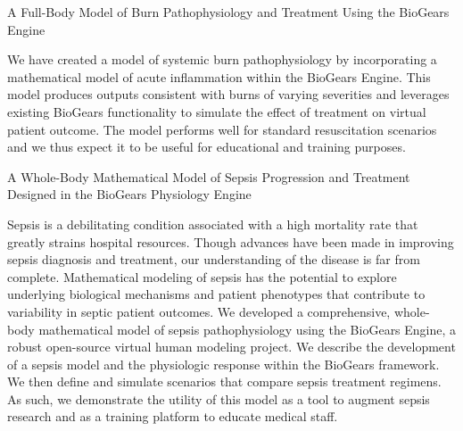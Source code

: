 \begin{refsection}
    \nocite{baird2013electro}

	\newrefcontext[sorting=nyt]
	\printbibliography[heading=none]
\end{refsection}


\begin{refsection}
    \nocite{baird2023Whole}

	\newrefcontext[sorting=nyt]
	\printbibliography[heading=none]
\end{refsection}


  \cventry
    {A Full-Body Model of Burn Pathophysiology and Treatment Using the BioGears Engine} %
    {} %
    {} %
    {} %
     {
    \begin{cvitems} %
    \item {We have created a model of systemic burn pathophysiology by incorporating a mathematical model of acute inflammation within the BioGears Engine. This model produces outputs consistent with burns of varying severities and leverages existing BioGears functionality to simulate the effect of treatment on virtual patient outcome. The model performs well for standard resuscitation scenarios and we thus expect it to be useful for educational and training purposes.}
    \end{cvitems}
     }

  \cventry
    {A Whole-Body Mathematical Model of Sepsis Progression and Treatment Designed in the BioGears Physiology Engine} %
    {} %
    {} %
    {} %
     {
    \begin{cvitems} %
    \item {Sepsis is a debilitating condition associated with a high mortality rate that greatly strains hospital resources. Though advances have been made in improving sepsis diagnosis and treatment, our understanding of the disease is far from complete. Mathematical modeling of sepsis has the potential to explore underlying biological mechanisms and patient phenotypes that contribute to variability in septic patient outcomes. We developed a comprehensive, whole-body mathematical model of sepsis pathophysiology using the BioGears Engine, a robust open-source virtual human modeling project. We describe the development of a sepsis model and the physiologic response within the BioGears framework. We then define and simulate scenarios that compare sepsis treatment regimens. As such, we demonstrate the utility of this model as a tool to augment sepsis research and as a training platform to educate medical staff.}
    \end{cvitems}
     }

